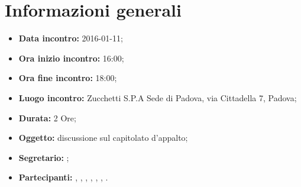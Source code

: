 \newpage
\section{Informazioni generali}
\begin{itemize}
\item \textbf{Data incontro:} 2016-01-11;
\item \textbf{Ora inizio incontro:} 16:00;
\item \textbf{Ora fine incontro:} 18:00;
\item \textbf{Luogo incontro:} Zucchetti S.P.A Sede di Padova, via Cittadella 7, Padova;
\item \textbf{Durata:} 2 Ore;
\item \textbf{Oggetto:} discussione sul capitolato d'appalto;
\item \textbf{Segretario:} \GR;
\item \textbf{Partecipanti:} \AF, \FB, \GN, \GR, \MV, \MP, \SM.
\end{itemize}
